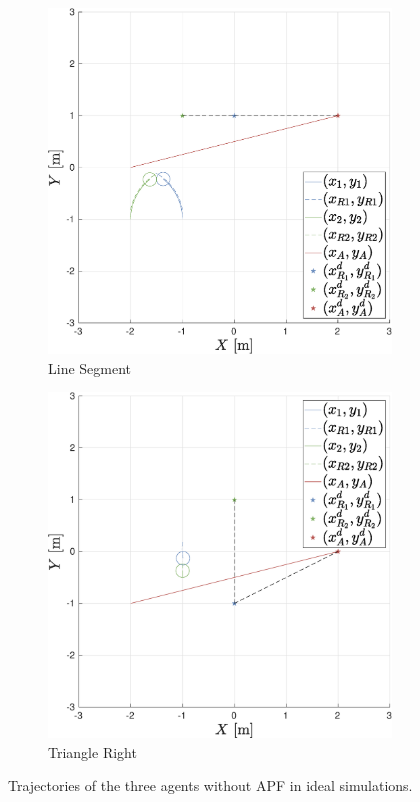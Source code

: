 \documentclass{ifacconf}
\begin{document}
\begin{figure}
\begin{subfigure}[b]{0.32\columnwidth}
        \includegraphics[width=\linewidth]{images/simulations/wo_APF/2nd_scenario_wo.eps}
        \caption{Line Segment}
         \label{fig:sim_woAPF_noNoise_2}
    \end{subfigure}
    \begin{subfigure}[b]{0.32\columnwidth}
        \centering
        \includegraphics[width=\linewidth]{images/simulations/wo_APF/3rd_scenario_wo.eps}
        \caption{Triangle Right}
         \label{fig:sim_woAPF_noNoise_3}
    \end{subfigure}
    \vspace{-0.2cm}
    \caption{Trajectories of the three agents without APF in ideal simulations.}
    \label{fig:sim_woAPF_noNoise}
\end{figure}
\end{document}

